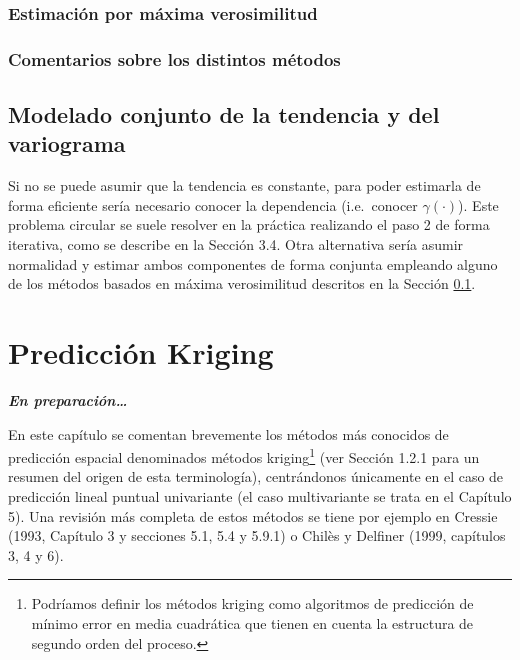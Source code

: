 \documentclass[
  spanish,
]{book}
\theoremstyle{break}
\begin{document}
\hypertarget{ml-fit}{%
\subsection{Estimación por máxima verosimilitud}\label{ml-fit}}

\hypertarget{comentarios-sobre-los-distintos-muxe9todos}{%
\subsection{Comentarios sobre los distintos métodos}\label{comentarios-sobre-los-distintos-muxe9todos}}

\hypertarget{modelado-conjunto-de-la-tendencia-y-del-variograma}{%
\section{Modelado conjunto de la tendencia y del variograma}\label{modelado-conjunto-de-la-tendencia-y-del-variograma}}

Si no se puede asumir que la tendencia es constante, para poder estimarla de forma eficiente sería necesario conocer la dependencia (i.e.~conocer \(\gamma(\cdot)\)).
Este problema circular se suele resolver en la práctica realizando el paso 2 de forma iterativa, como se describe en la Sección 3.4.
Otra alternativa sería asumir normalidad y estimar ambos componentes de forma conjunta empleando alguno de los métodos basados en máxima verosimilitud descritos en la Sección \ref{ml-fit}.

\hypertarget{kriging}{%
\chapter{Predicción Kriging}\label{kriging}}

\textbf{\emph{En preparación\ldots{}}}

En este capítulo se comentan brevemente los métodos más conocidos de predicción espacial denominados métodos kriging\footnote{Podríamos definir los métodos kriging como algoritmos de predicción de mínimo error en media cuadrática que tienen en cuenta la estructura de segundo orden del proceso.} (ver Sección 1.2.1 para un resumen del origen de esta terminología), centrándonos únicamente en el caso de predicción lineal puntual univariante (el caso multivariante se trata en el Capítulo 5).
Una revisión más completa de estos métodos se tiene por ejemplo en Cressie (1993, Capítulo 3 y secciones 5.1, 5.4 y 5.9.1) o Chilès y Delfiner (1999, capítulos 3, 4 y 6).
\end{document}

